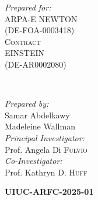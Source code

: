 \begin{titlepage}
       \begin{minipage}{0.4\textwidth}
               \begin{flushleft}
                       \large
                       \textit{Prepared for:}\\
                       ARPA-E NEWTON\\
                       (DE-FOA-0003418)
                       \vspace{4mm}\\
                        \textsc{Contract}\\
                        EINSTEIN\\%
                        (DE-AR0002080)\\%
                \end{flushleft}
       \end{minipage}
       ~
       \begin{minipage}{0.4\textwidth}
               \begin{flushright}
                       \large
                       \textit{Prepared by:}\\
                       Samar Abdelkawy\\
                       Madeleine Wallman 
                       \vspace{4mm}\\
                       \textit{Principal Investigator:}\\ %
                       Prof. Angela Di \textsc{Fulvio}\\ %
                       \textit{Co-Investigator:}\\ %
                       Prof. Kathryn D. \textsc{Huff} %
               \end{flushright}
    \end{minipage}
    

    \vspace{1cm}
    \textsc{\LARGE\bfseries UIUC-ARFC-2025-01} %
    \vspace{0.5cm}
    

\end{titlepage}
